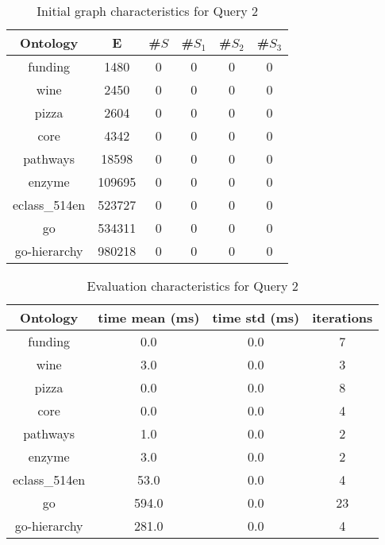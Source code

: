 \begin{table*}[ht]
	\centering
	\caption{Initial graph characteristics for Query 2}
	\label{tbl4}
	
	\begin{tabular}{ | c | c | c | c | c | c |}
		\hline
		Ontology & E & \#$S$ & \#$S_1$ & \#$S_2$ & \#$S_3$\\
		\hline 
		\hline
		funding        & 1480 & 0 & 0 & 0 & 0\\
		wine           & 2450 & 0 & 0 & 0 & 0\\
		pizza          & 2604 & 0 & 0 & 0 & 0\\
		core           & 4342 & 0 & 0 & 0 & 0\\
		pathways       & 18598 & 0 & 0 & 0 & 0\\
		enzyme         & 109695 & 0 & 0 & 0 & 0\\
		eclass\_514en  & 523727 & 0 & 0 & 0 & 0\\
		go             & 534311 & 0 & 0 & 0 & 0\\
		go-hierarchy   & 980218 & 0 & 0 & 0 & 0\\
		\hline
	\end{tabular}
	
\end{table*}

\begin{table*}[ht]
	\centering
	\caption{Evaluation characteristics for Query 2}
	\label{tbl5}
	
	\begin{tabular}{ | c | c | c | c |}
		\hline
		Ontology & time mean (ms) & time std (ms) & iterations \\
		\hline 
		\hline
		funding        & 0.0 & 0.0 & 7\\
		wine           & 3.0 & 0.0 & 3\\
		pizza          & 0.0 & 0.0 & 8\\
		core           & 0.0 & 0.0 & 4\\
		pathways       & 1.0 & 0.0 & 2\\
		enzyme         & 3.0 & 0.0 & 2\\
		eclass\_514en  & 53.0 & 0.0 & 4\\
		go             & 594.0 & 0.0 & 23\\
		go-hierarchy   & 281.0 & 0.0 & 4\\
		\hline
	\end{tabular}
	
\end{table*}

